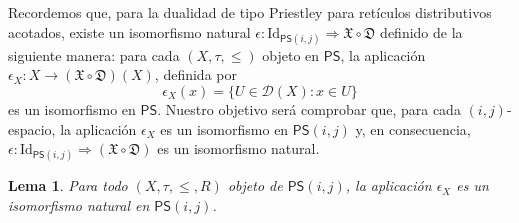 \documentclass[12pt]{book}
\newtheorem{lemma}[theorem]{Lema}
\newcommand{\Id}{\mathrm{Id}}
\newcommand{\PS}{\mathsf{PS}}
\newcommand{\D}{\mathfrak{D}}
\begin{document}
Recordemos que, para la dualidad de tipo Priestley para retículos distributivos acotados, existe un isomorfismo natural $\epsilon \colon \Id_{\PS(i,j)} \Rightarrow \mathfrak{X} \circ \D$ definido de la siguiente manera: para cada $(X,\tau,\leq)$ objeto en $\PS$, la aplicación $\epsilon_{X} \colon X \to (\mathfrak{X}\circ \D)(X)$, definida por
\[ \epsilon_{X}(x) = \{ U \in \mathcal{D}(X) \colon x \in U \} \]
es un isomorfismo en $\PS$. Nuestro objetivo será comprobar que, para cada $(i,j)$-espacio, la aplicación $\epsilon_{X}$ es un isomorfismo en $\PS(i,j)$ y, en consecuencia, $\epsilon \colon \Id_{\PS(i,j)} \Rightarrow (\mathfrak{X}\circ \D)$ es un isomorfismo natural.


\begin{lemma}\label{Lema de Equivalencia Natural para PS} Para todo $(X, \tau, \leq, R)$ objeto de $\PS(i,j)$, la aplicación
$\epsilon_{X}$ es un isomorfismo natural en $\PS(i,j)$.
\end{lemma}
\end{document}
